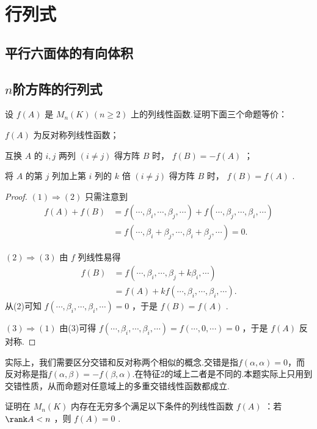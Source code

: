 \section{行列式}
\subsection{平行六面体的有向体积}
\subsection{\texorpdfstring{$n$}{n}阶方阵的行列式}
\begin{prob}[2]
	设 $f(A)$ 是 $M_n(K)\,(n\ge2)$ 上的列线性函数.证明下面三个命题等价：
	\begin{mylist}
		\item $f(A)$ 为反对称列线性函数；
		\item 互换 $A$ 的 $i,j$ 两列 $(i\ne j)$ 得方阵 $B$ 时， $f(B)=-f(A)$ ；
		\item 将 $A$ 的第 $j$ 列加上第 $i$ 列的 $k$ 倍 $(i\ne j)$ 得方阵 $B$ 时， $f(B)=f(A)$ .
	\end{mylist}
\end{prob}
\begin{proof}
	$(1)\Rightarrow(2)$ 只需注意到
	\begin{align*}
		f(A)+f(B) & =f(\cdots,\beta_i,\cdots,\beta_j,\cdots)+f(\cdots,\beta_j,\cdots,\beta_i,\cdots) \\
		          & =f(\cdots,\beta_i+\beta_j,\cdots,\beta_i+\beta_j,\cdots)=0.
	\end{align*}\par
	$(2)\Rightarrow(3)$ 由 $f$ 列线性易得
	\begin{align*}
		f(B) & =f(\cdots,\beta_i,\cdots,\beta_j+k\beta_i,\cdots) \\
		     & =f(A)+kf(\cdots,\beta_i,\cdots,\beta_i,\cdots).
	\end{align*}
	从(2)可知 $f(\cdots,\beta_i,\cdots,\beta_i,\cdots)=0$ ，于是 $f(B)=f(A)$ .\par
	$(3)\Rightarrow(1)$ 由(3)可得 $f(\cdots,\beta_i,\cdots,\beta_i,\cdots)=f(\cdots,0,\cdots)=0$ ，于是 $f(A)$ 反对称.
\end{proof}
\begin{note}
	实际上，我们需要区分交错和反对称两个相似的概念.交错是指$f(\alpha,\alpha)=0$，而反对称是指$f(\alpha,\beta)=-f(\beta,\alpha)$.在特征2的域上二者是不同的.本题实际上只用到交错性质，从而命题对任意域上的多重交错线性函数都成立.
\end{note}
\begin{prob}[3]
	证明在 $M_n(K)$ 内存在无穷多个满足以下条件的列线性函数 $f(A)$ ：若 $\rank A<n$ ，则 $f(A)=0$ .
\end{prob}
